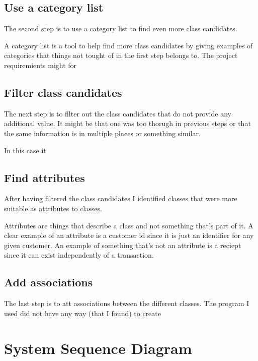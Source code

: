 \documentclass[a4paper]{scrreprt}
\begin{document}
        \subsection{Use a category list}
            The second step is to use a category list to find even more class
            candidates.

            A category list is a tool to help find more class candidates by
            giving examples of categories that things not tought of in the first
            step belongs to. The project requiremients might for  
        
        \subsection{Filter class candidates}
            The next step is to filter out the class candidates that do not
            provide any additional value. It might be that one was too thorugh
            in previous steps or that the same information is in multiple places
            or something similar.
            
            In this case it 

        \subsection{Find attributes}
            After having filtered the class candidates I identified classes that
            were more suitable as attributes to classes. 
            
            Attributes are things that describe a class and not something that's
            part of it. A clear example of an attribute is a customer id since
            it is just an identifier for any given customer. An example of
            something that's not an attribute is a reciept since it can exist
            independently of a transaction.

        \subsection{Add associations}
            The last step is to att associations between the different classes.
            The program I used did not have any way (that I found) to create 

    \section{System Sequence Diagram}
            
\end{document}
